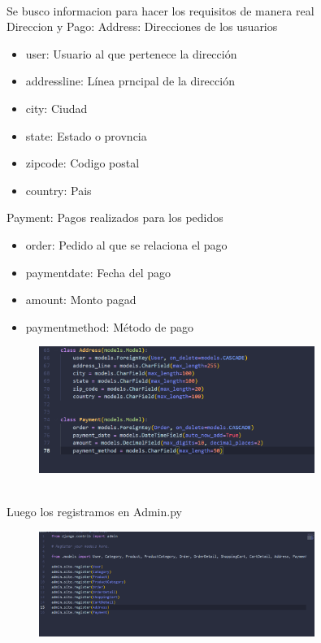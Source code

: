 \documentclass{article}
\begin{document}
\\Se busco informacion para hacer los requisitos de manera real 
\\Direccion y Pago:
Address: Direcciones de los usuarios
\begin{itemize}
    \item user: Usuario al que pertenece la dirección
    \item addressline: Línea prncipal de la dirección
    \item city: Ciudad
    \item state: Estado o provncia
    \item zipcode: Codigo postal
    \item country: Pais
\end{itemize}
Payment: Pagos realizados para los pedidos
\begin{itemize}
    \item order: Pedido al que se relaciona el pago
    \item paymentdate: Fecha del pago
    \item amount: Monto pagad
    \item paymentmethod: Método de pago
\end{itemize}

    \begin{figure}[H]
		          \centering
		          \includegraphics[width=0.8\textwidth,keepaspectratio]                       {img/AddPay.png}
    \end{figure}
\\Luego los registramos en Admin.py 

    \begin{figure}[H]
		          \centering
		          \includegraphics[width=0.8\textwidth,keepaspectratio]                       {img/register.png}
    \end{figure}
\end{document}
